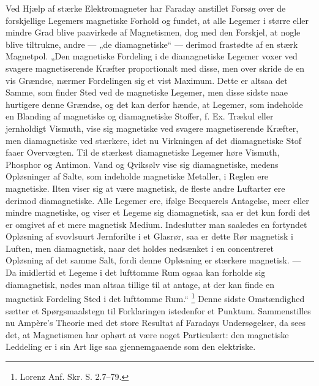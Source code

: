 \documentclass[12pt,a4paper]{book}
\begin{document}
Ved Hjælp af stærke Elektromagneter har Faraday anstillet Forsøg over
de forskjellige Legemers magnetiske Forhold og fundet, at alle Legemer
i større eller mindre Grad blive paavirkede af Magnetismen, dog med
den Forskjel, at nogle blive tiltrukne, andre --- „de diamagnetiske“
--- derimod frastødte af en stærk Magnetpol. „Den magnetiske Fordeling
i de diamagnetiske Legemer voxer ved svagere magnetiserende Kræfter
proportionalt med disse, men over\-%
skride de en vis Grændse, nærmer Fordelingen sig et vist Maximum.
Dette er altsaa det Samme, som finder Sted ved de magnetiske Legemer,
men disse sidste naae hurtigere denne Grændse, og det kan derfor
hænde, at Legemer, som indeholde en Blanding af magnetiske og
diamagnetiske Stoffer, f. Ex. Trækul eller jernholdigt Vismuth, vise
sig magnetiske ved svagere magnetiserende Kræfter, men diamagnetiske
ved stærkere, idet nu Virkningen af det diamagnetiske Stof faaer
Overvægten. Til de stærkest diamagnetiske Legemer høre Vismuth,
Phosphor og Antimon. Vand og Qviksølv vise sig diamagnetiske, medens
Opløsninger af Salte, som indeholde magnetiske Metaller, i Reglen ere
magnetiske. Ilten viser sig at være magnetisk, de fleste andre
Luftarter ere derimod diamagnetiske. Alle Legemer ere, ifølge
Becquerels Antagelse, meer eller mindre magnetiske, og viser et Legeme
sig diamagnetisk, saa er det kun fordi det er omgivet af et mere
magnetisk Medium. Indeslutter man saaledes en fortyndet Opløsning af
svovlsuurt Jernforilte i et Glasrør, saa er dette Rør magnetisk i
Luften, men diamagnetisk, naar det holdes nedsænket i en concentreret
Opløsning af det samme Salt, fordi denne Opløsning er stærkere
magnetisk. --- Da imidlertid et Legeme i det lufttomme Rum ogsaa kan
forholde sig diamagnetisk, nødes man altsaa tillige til at antage, at
der kan finde en magnetisk Fordeling Sted i det lufttomme Rum.“ %
\footnote{%
Lorenz Anf. Skr. S. 2.7--79.}
Denne sidste Omstændighed sætter et Spørgsmaalstegn til Forklaringen
istedenfor et Punktum. Sammenstilles nu Ampère's Theorie med det store
Resultat af Faradays Undersøgelser, da sees det, at Magnetismen har
ophørt at være noget Particulært: den magnetiske Leddeling er i sin
Art lige saa gjennemgaaende som den elektriske.
\end{document}
